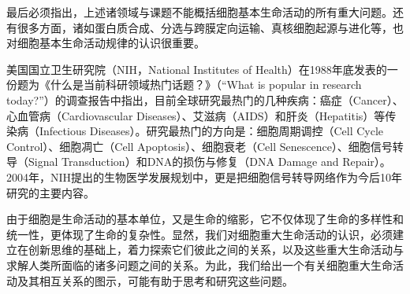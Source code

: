 最后必须指出，上述诸领域与课题不能概括细胞基本生命活动的所有重大问题。还有很多方面，诸如蛋白质合成、分选与跨膜定向运输、真核细胞起源与进化等，也对细胞基本生命活动规律的认识很重要。

美国国立卫生研究院（NIH，National Institutes of Health）在1988年底发表的一份题为《什么是当前科研领域热门话题？》（``What is popular in research today?''）的调查报告中指出，目前全球研究最热门的几种疾病：癌症（Cancer）、心血管病（Cardiovascular Diseases）、艾滋病（AIDS）和肝炎（Hepatitis）等传染病（Infectious Diseases）。研究最热门的方向是：细胞周期调控（Cell Cycle Control）、细胞凋亡（Cell Apoptosis）、细胞衰老（Cell Senescence）、细胞信号转导（Signal Transduction）和DNA的损伤与修复（DNA Damage and Repair）。2004年，NIH提出的生物医学发展规划中，更是把细胞信号转导网络作为今后10年研究的主要内容。

由于细胞是生命活动的基本单位，又是生命的缩影，它不仅体现了生命的多样性和统一性，更体现了生命的复杂性。显然，我们对细胞重大生命活动的认识，必须建立在创新思维的基础上，着力探索它们彼此之间的关系，以及这些重大生命活动与求解人类所面临的诸多问题之间的关系。为此，我们给出一个有关细胞重大生命活动及其相互关系的图示，可能有助于思考和研究这些问题。

